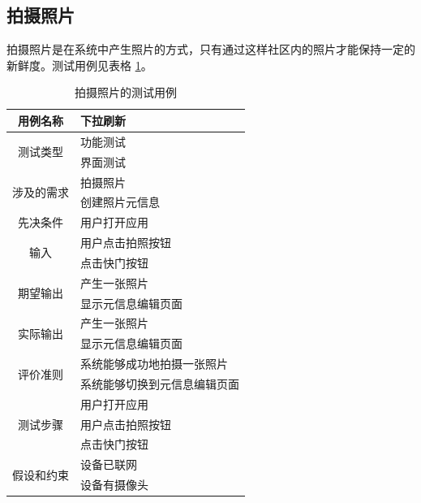 \subsection{拍摄照片}

拍摄照片是在系统中产生照片的方式，只有通过这样社区内的照片才能保持一定的新鲜度。测试用例见表格 \ref{new-photo}。

\begin{table}
    \centering
    \caption{拍摄照片的测试用例}
    \label{new-photo}
    \begin{tabular}{c|l}
        \hline
        用例名称    & 下拉刷新       \\ \hline
        \multirow{2}{*}{测试类型}    & 功能测试     \\
                                    & 界面测试     \\ \hline
        \multirow{2}{*}{涉及的需求}  & 拍摄照片       \\
                                    & 创建照片元信息  \\
        \multirow{1}{*}{先决条件}    & 用户打开应用    \\ \hline
        \multirow{2}{*}{输入}       & 用户点击拍照按钮 \\
                                    & 点击快门按钮 \\ \hline
        \multirow{2}{*}{期望输出}    & 产生一张照片     \\
                                    & 显示元信息编辑页面   \\ \hline
        \multirow{2}{*}{实际输出}    & 产生一张照片 \\
                                    & 显示元信息编辑页面   \\ \hline
        \multirow{2}{*}{评价准则}   & 系统能够成功地拍摄一张照片 \\
                                   & 系统能够切换到元信息编辑页面 \\ \hline
        \multirow{3}{*}{测试步骤}   & 用户打开应用    \\
                                   & 用户点击拍照按钮 \\
                                   & 点击快门按钮    \\ \hline
        \multirow{2}{*}{假设和约束}  & 设备已联网 \\
                                    & 设备有摄像头 \\ \hline
    \end{tabular}
\end{table}

